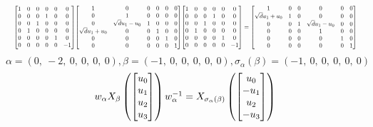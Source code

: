 \documentclass[11pt]{article}
\theoremstyle{definition}
\begin{document}
\[
\scaletoalign{\textwidth}{{\left[\begin{matrix}1 & 0 & 0 & 0 & 0 & 0\\0 & 0 & 0 & 1 & 0 & 0\\0 & 0 & 1 & 0 & 0 & 0\\0 & 1 & 0 & 0 & 0 & 0\\0 & 0 & 0 & 0 & 1 & 0\\0 & 0 & 0 & 0 & 0 & -1\end{matrix}\right]} {\left[\begin{matrix}1 & 0 & 0 & 0 & 0 & 0\\0 & 1 & 0 & 0 & 0 & 0\\0 & \sqrt{d} u_{1} - u_{0} & 1 & 0 & 0 & 0\\\sqrt{d} u_{1} + u_{0} & 0 & 0 & 1 & 0 & 0\\0 & 0 & 0 & 0 & 1 & 0\\0 & 0 & 0 & 0 & 0 & 1\end{matrix}\right]} {\left[\begin{matrix}1 & 0 & 0 & 0 & 0 & 0\\0 & 0 & 0 & 1 & 0 & 0\\0 & 0 & 1 & 0 & 0 & 0\\0 & 1 & 0 & 0 & 0 & 0\\0 & 0 & 0 & 0 & 1 & 0\\0 & 0 & 0 & 0 & 0 & -1\end{matrix}\right]} = {\left[\begin{matrix}1 & 0 & 0 & 0 & 0 & 0\\\sqrt{d} u_{1} + u_{0} & 1 & 0 & 0 & 0 & 0\\0 & 0 & 1 & \sqrt{d} u_{1} - u_{0} & 0 & 0\\0 & 0 & 0 & 1 & 0 & 0\\0 & 0 & 0 & 0 & 1 & 0\\0 & 0 & 0 & 0 & 0 & 1\end{matrix}\right]}}
\]
\[
\alpha = \left( 0, \  -2, \  0, \  0, \  0, \  0\right), \beta = \left( -1, \  0, \  0, \  0, \  0, \  0\right), \sigma_{\alpha}(\beta) = \left( -1, \  0, \  0, \  0, \  0, \  0\right)
\]
\[
\scaletoalign{\textwidth}{w_{\alpha} X_{\beta}\left(\left[\begin{matrix}u_{0}\\u_{1}\\u_{2}\\u_{3}\end{matrix}\right]\right) w_{\alpha}^{-1} = X_{\sigma_{\alpha}\left(\beta\right)}\left(\left[\begin{matrix}u_{0}\\- u_{1}\\u_{2}\\- u_{3}\end{matrix}\right]\right)}
\]
\end{document}
